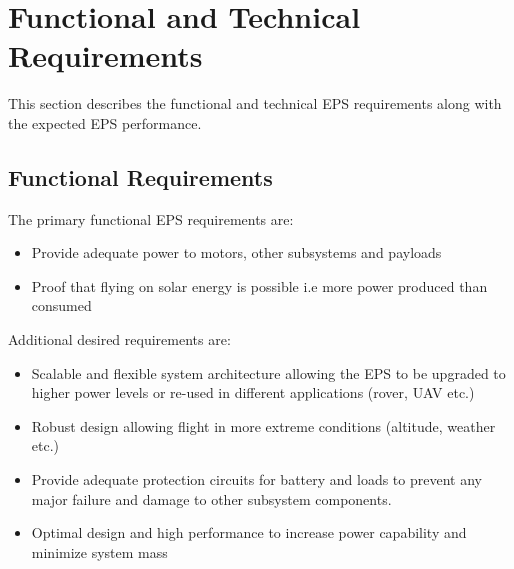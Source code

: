 \newpage
\section{Functional and Technical Requirements}
\label{sec:requirements}
This section describes the functional and technical \ac{EPS} requirements along with the expected \ac{EPS} performance.
%
\subsection{Functional Requirements}
The primary functional \ac{EPS} requirements are:
%
\begin{itemize}
\item Provide adequate power to motors, other subsystems and payloads
\item Proof that flying on solar energy is possible i.e more power produced than consumed
\end{itemize}
%
Additional desired requirements are:
%
\begin{itemize}
\item Scalable and flexible system architecture allowing the \ac{EPS} to be upgraded to higher power levels or re-used in different applications (rover, \ac{UAV} etc.)
\item Robust design allowing flight in more extreme conditions (altitude, weather etc.)
\item Provide adequate protection circuits for battery and loads to prevent any major failure and damage to other subsystem components.
\item Optimal design and high performance to increase power capability and minimize system mass
\end{itemize}
%

